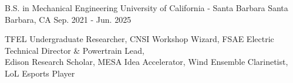 


\begin{cventries}

\cventry
{B.S. in Mechanical Engineering} %
{University of California - Santa Barbara} %
{Santa Barbara, CA} %
{Sep. 2021 - Jun. 2025} %
{ %
\begin{cvitems}
\item {TFEL Undergraduate Researcher, CNSI Workshop Wizard, FSAE Electric Technical Director \& Powertrain Lead, \\ Edison Research Scholar, MESA Idea Accelerator,  Wind Ensemble Clarinetist, LoL Esports Player}
\end{cvitems}
}





\end{cventries}